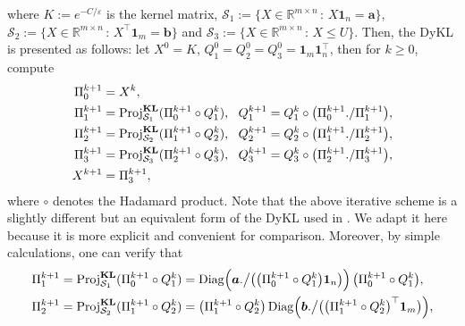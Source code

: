 \documentclass[10pt]{article}
\begin{document}
\begin{appendices}
\begin{equation*}
\end{equation*}
where $K:=e^{-C/\varepsilon}$ is the kernel matrix, $\mathcal{S}_1:=\{X\in\mathbb{R}^{m \times n}\,:\,X\bm{1}_{n} = \bm{a}\}$, $\mathcal{S}_2:=\{X\in\mathbb{R}^{m \times n}\,:\,X^{\top}\bm{1}_{m} = \bm{b}\}$ and $\mathcal{S}_3:=\{X\in\mathbb{R}^{m \times n}\,:\,X \leq U\}$.
Then, the DyKL is presented as follows: let $X^{0}=K$, $Q^{0}_1=Q^{0}_2=Q^{0}_3=\bm{1}_m\bm{1}_n^{\top}$, then for $k\geq0$, compute
\begin{equation}\label{Dykentropreform}
\begin{aligned}
\Pi^{k+1}_0 &= X^{k}, \\
\Pi^{k+1}_1 &= \mathrm{Proj}^{\mathbf{KL}}_{\mathcal{S}_{1}}(\Pi^{k+1}_0 \circ Q^{k}_1),
~~Q^{k+1}_1 = Q^{k}_1 \circ \big{(}\Pi^{k+1}_0./\Pi^{k+1}_1\big{)}, \\
\Pi^{k+1}_2 &= \mathrm{Proj}^{\mathbf{KL}}_{\mathcal{S}_{2}}(\Pi^{k+1}_1 \circ Q^{k}_2),
~~Q^{k+1}_2 = Q^{k}_2 \circ \big{(}\Pi^{k+1}_1./\Pi^{k+1}_2\big{)}, \\
\Pi^{k+1}_3 &= \mathrm{Proj}^{\mathbf{KL}}_{\mathcal{S}_{3}}(\Pi^{k+1}_2 \circ Q^{k}_3),
~~Q^{k+1}_3 = Q^{k}_3 \circ \big{(}\Pi^{k+1}_2./\Pi^{k+1}_3\big{)}, \\
X^{k+1} &= \Pi^{k+1}_3,
\end{aligned}
\end{equation}
where $\circ$ denotes the Hadamard product. Note that the above iterative scheme is a slightly different but an equivalent form of the DyKL used in \cite{bccnp2015iterative}. We adapt it here because it is more explicit and convenient for comparison. Moreover, by simple calculations, one can verify that
\begin{equation*}
\begin{aligned}
\Pi^{k+1}_1 &= \mathrm{Proj}^{\mathbf{KL}}_{\mathcal{S}_{1}}(\Pi^{k+1}_0 \circ Q^{k}_1)= \mathrm{Diag}\Big(\bm{a}.\big{/}\big(\big{(}\Pi^{k+1}_0 \circ Q^{k}_1\big{)}\bm{1}_n\big)\Big)\,\big{(}\Pi^{k+1}_0 \circ Q^{k}_1\big{)}, \\
\Pi^{k+1}_2 &= \mathrm{Proj}^{\mathbf{KL}}_{\mathcal{S}_{2}}(\Pi^{k+1}_1 \circ Q^{k}_2)= \big{(}\Pi^{k+1}_1 \circ Q^{k}_2\big{)}\,\mathrm{Diag}\Big(\bm{b}.\big{/}\big(\big{(}\Pi^{k+1}_1 \circ Q^{k}_2\big{)}^{\top}\bm{1}_m\big)\Big), \\

\end{aligned}
\end{equation*}
\end{appendices}
\end{document}
